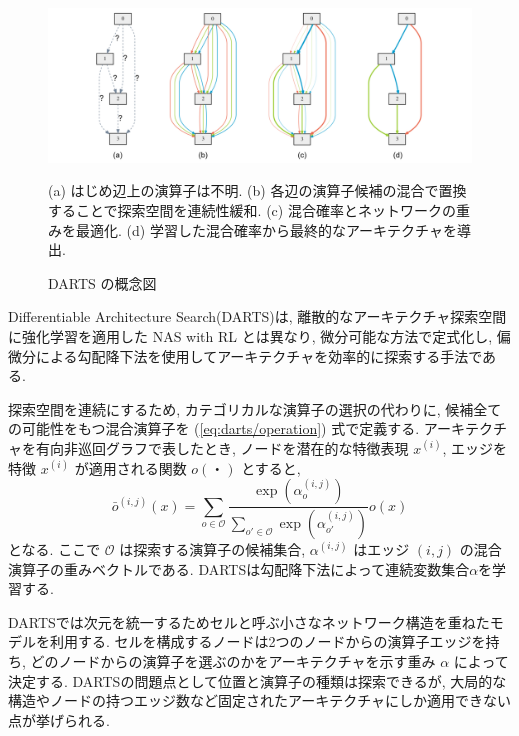 \begin{figure}[t]
  \begin{center}
    \includegraphics[clip,width=15cm]{./fig/02.tech/darts.png}
  \end{center}
  \caption{DARTS の概念図}
  (a) はじめ辺上の演算子は不明. (b) 各辺の演算子候補の混合で置換することで探索空間を連続性緩和. (c) 混合確率とネットワークの重みを最適化. (d) 学習した混合確率から最終的なアーキテクチャを導出.
  \label{fig:darts}
\end{figure}

Differentiable Architecture Search(DARTS)\cite{DBLP:journals/corr/abs-1806-09055}は,
離散的なアーキテクチャ探索空間に強化学習を適用した NAS with RL とは異なり,
微分可能な方法で定式化し,
偏微分による勾配降下法を使用してアーキテクチャを効率的に探索する手法である.

探索空間を連続にするため, カテゴリカルな演算子の選択の代わりに, 候補全ての可能性をもつ混合演算子を
(\ref{eq:darts/operation}) 式で定義する.
アーキテクチャを有向非巡回グラフで表したとき, ノードを潜在的な特徴表現 $x^{(i)}$,
エッジを特徴 $x^{(i)}$ が適用される関数 $o(・)$ とすると,
\begin{equation}
  \label{eq:darts/operation}
  \bar{o}^{(i, j)}(x) = \sum_{o \in \mathcal{O}} \frac{\exp(\alpha^{(i, j)}_o)}{\sum_{o' \in \mathcal{O}} \exp(\alpha^{(i, j)}_{o'})} o(x)
\end{equation}
となる. ここで
$\mathcal{O}$ は探索する演算子の候補集合,
$\alpha^{(i, j)}$ はエッジ $(i, j)$ の混合演算子の重みベクトルである.
DARTSは勾配降下法によって連続変数集合$\alpha$を学習する.


DARTSでは次元を統一するためセルと呼ぶ小さなネットワーク構造を重ねたモデルを利用する.
セルを構成するノードは2つのノードからの演算子エッジを持ち,
どのノードからの演算子を選ぶのかをアーキテクチャを示す重み $\alpha$ によって決定する.
DARTSの問題点として位置と演算子の種類は探索できるが,
大局的な構造やノードの持つエッジ数など固定されたアーキテクチャにしか適用できない点が挙げられる.


